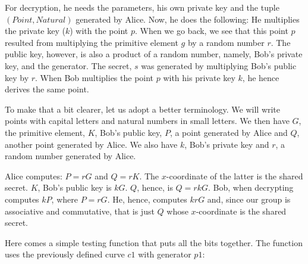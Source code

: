 \documentclass[tikz]{scrreprt}
\newcommand{\Conid}[1]{\mathit{#1}}
\begin{document}
For decryption, he needs the parameters,
his own private key and the tuple \ensuremath{(\Conid{Point},\Conid{Natural})} generated by Alice.
Now, he does the following:
He multiplies the private key ($k$) with the point $p$.
When we go back, we see that this point $p$
resulted from multiplying the primitive element $g$ by a random number $r$.
The public key, however, is also a product of a random number, namely,
Bob's private key, and the generator.
The secret, $s$ was generated by multiplying Bob's public key
by $r$. When Bob multiplies the point $p$ with his private key $k$,
he hence derives the same point.

To make that a bit clearer, let us adopt a better terminology.
We will write points with capital letters and natural numbers
in small letters. We then have 
$G$, the primitive element,
$K$, Bob's public key, 
$P$, a point generated by Alice and
$Q$, another point generated by Alice.
We also have
$k$, Bob's private key and
$r$, a random number generated by Alice.

Alice computes:
$P=rG$ and $Q=rK$. The $x$-coordinate of the latter is the shared secret.
$K$, Bob's public key is $kG$.
$Q$, hence, is $Q=rkG$.
Bob, when decrypting computes $kP$, where $P=rG$.
He, hence, computes $krG$ and,
since our group is associative and commutative, that is just $Q$
whose $x$-coordinate is the shared secret.

Here comes a simple testing function
that puts all the bits together.
The function uses the previously defined curve 
$c1$ with generator $p1$:
\end{document}

